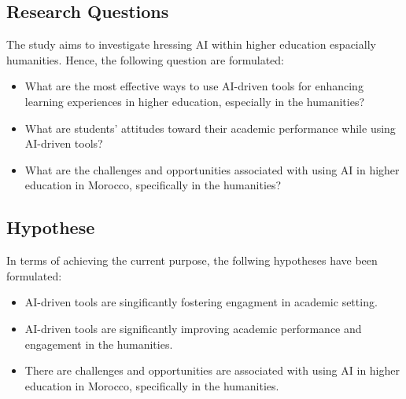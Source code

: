 \subsection{Research Questions}
The study aims to investigate hressing AI within higher education espacially humanities. Hence,
the following question are formulated:
\begin{itemize}
	\item What are the most effective ways to use AI-driven
	      tools for enhancing learning experiences in higher education,
	      especially in the humanities?
	\item What are students’ attitudes toward their academic performance
	      while using AI-driven tools?
	\item What are the challenges and opportunities associated
	      with using AI in higher education in Morocco,
	      specifically in the humanities?
\end{itemize}

\subsection{Hypothese}
In terms of achieving the current purpose, the follwing hypotheses have been formulated:
\begin{itemize}
	\item AI-driven tools are singificantly fostering engagment in academic setting.
	\item AI-driven tools are significantly improving academic
	      performance and engagement in the humanities.
	\item There are challenges and opportunities are associated with using AI in higher
	      education in Morocco, specifically in the humanities.
\end{itemize}

